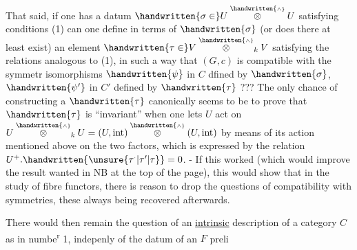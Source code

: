 That said, if one has a datum $\handwritten{\sigma\in}U\overset{\handwritten{\scriptscriptstyle\wedge}}{\otimes} U$ satisfying conditions (1) can one define in terms of $\handwritten{\sigma}$ (or does there at least exist) an element $\handwritten{\tau\in}V\overset{\handwritten{\scriptscriptstyle\wedge}}{\otimes}_k V$ satisfying the relations analogous to (1), in such a way that $(G,c)$ is compatible with the symmetr isomorphisms $\handwritten{\psi}$ in $C$ dfined by $\handwritten{\sigma}$, $\handwritten{\psi'}$ in $C'$ defined by $\handwritten{\tau}$ ??? The only chance of  constructing a $\handwritten{\tau}$ canonically seems to be to prove that $\handwritten{\tau}$ is ``invariant'' when one lets $U$ act on $U\overset{\handwritten{\scriptscriptstyle\wedge}}{\otimes}_k U=(U,\mathrm{int})\overset{\handwritten{\scriptscriptstyle\wedge}}{\otimes}(U,\mathrm{int})$ by means of its action mentioned above on the two factors, which is expressed by the relation $U^+ .\handwritten{\unsure{\tau^{\scriptscriptstyle\cdot}|\tau'|\tau}}=0$. - If this worked (which would improve the result wanted in NB at the top of the page), this would show that in the study of fibre functors, there is reason to drop the questions of compatibility with symmetries, these always being recovered afterwards.

There would then remain the question of an \uline{intrinsic} description of a category $C$ as in numbe\textsuperscript{r} 1, indepenly of the datum of an $F$ preli%
